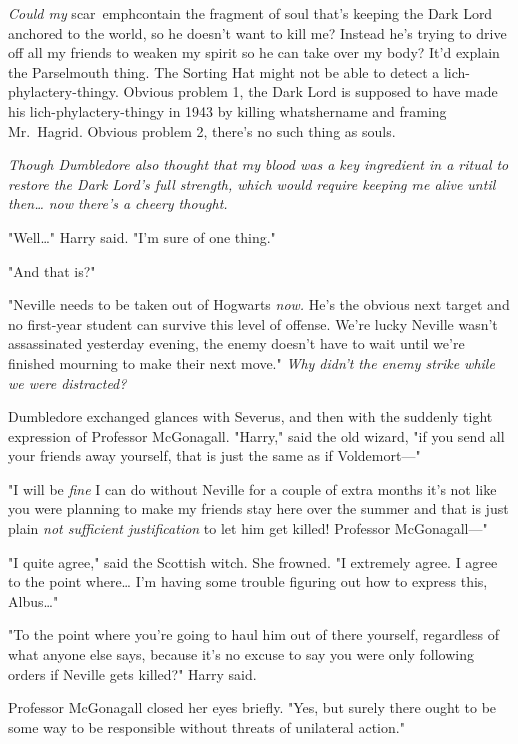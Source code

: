\emph{Could my} scar\ emph{contain the fragment of soul that's keeping the Dark 
Lord anchored to the world, so he doesn't want to kill me? Instead he's trying 
to drive off all my friends to weaken my spirit so he can take over my body? 
It'd explain the Parselmouth thing. The Sorting Hat might not be able to detect 
a lich-phylactery-thingy. Obvious problem 1, the Dark Lord is supposed to have 
made his lich-phylactery-thingy in 1943 by killing whatshername and framing 
Mr.~Hagrid. Obvious problem 2, there's no such thing as souls.}

\emph{Though Dumbledore also thought that my blood was a key ingredient in a 
ritual to restore the Dark Lord's full strength, which would require keeping me 
alive until then{\ldots} now there's a cheery thought.}

"Well{\ldots}" Harry said. "I'm sure of one thing."

"And that is?"

"Neville needs to be taken out of Hogwarts \emph{now.} He's the obvious next 
target and no first-year student can survive this level of offense. We're lucky 
Neville wasn't assassinated yesterday evening, the enemy doesn't have to wait 
until we're finished mourning to make their next move." \emph{Why didn't the 
enemy strike while we were distracted?}

Dumbledore exchanged glances with Severus, and then with the suddenly tight 
expression of Professor McGonagall. "Harry," said the old wizard, "if you send 
all your friends away yourself, that is just the same as if Voldemort---"

"I will be \emph{fine} I can do without Neville for a couple of extra months 
it's not like you were planning to make my friends stay here over the summer 
and that is just plain \emph{not sufficient justification} to let him get 
killed! Professor McGonagall---"

"I quite agree," said the Scottish witch. She frowned. "I extremely agree. I 
agree to the point where{\ldots} I'm having some trouble figuring out how to 
express this, Albus{\ldots}"

"To the point where you're going to haul him out of there yourself, regardless 
of what anyone else says, because it's no excuse to say you were only following 
orders if Neville gets killed?" Harry said.

Professor McGonagall closed her eyes briefly. "Yes, but surely there ought to 
be some way to be responsible without threats of unilateral action."

